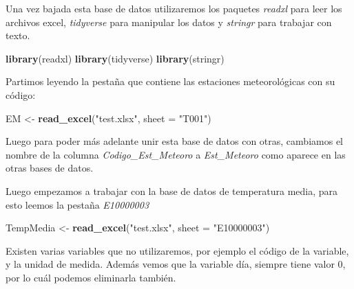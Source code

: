 \documentclass[]{book}
\newenvironment{Shaded}{\begin{snugshade}}{\end{snugshade}}
\newcommand{\DataTypeTok}[1]{\textcolor[rgb]{0.13,0.29,0.53}{#1}}
\newcommand{\KeywordTok}[1]{\textcolor[rgb]{0.13,0.29,0.53}{\textbf{#1}}}
\newcommand{\NormalTok}[1]{#1}
\newcommand{\OperatorTok}[1]{\textcolor[rgb]{0.81,0.36,0.00}{\textbf{#1}}}
\newcommand{\StringTok}[1]{\textcolor[rgb]{0.31,0.60,0.02}{#1}}
\begin{document}
Una vez bajada esta base de datos utilizaremos los paquetes
\emph{readxl} para leer los archivos excel, \emph{tidyverse} para
manipular los datos y \emph{stringr} para trabajar con texto.

\begin{Shaded}
\begin{Highlighting}[]
\KeywordTok{library}\NormalTok{(readxl)}
\KeywordTok{library}\NormalTok{(tidyverse)}
\KeywordTok{library}\NormalTok{(stringr)}
\end{Highlighting}
\end{Shaded}

Partimos leyendo la pestaña que contiene las estaciones meteorológicas
con su código:

\begin{Shaded}
\begin{Highlighting}[]
\NormalTok{EM <-}\StringTok{ }\KeywordTok{read_excel}\NormalTok{(}\StringTok{"test.xlsx"}\NormalTok{, }\DataTypeTok{sheet =} \StringTok{"T001"}\NormalTok{)}
\end{Highlighting}
\end{Shaded}

Luego para poder más adelante unir esta base de datos con otras,
cambiamos el nombre de la columna \emph{Codigo\_Est\_Meteoro} a
\emph{Est\_Meteoro} como aparece en las otras bases de datos.

\begin{Shaded}
\end{Shaded}

Luego empezamos a trabajar con la base de datos de temperatura media,
para esto leemos la pestaña \emph{E10000003}

\begin{Shaded}
\begin{Highlighting}[]
\NormalTok{TempMedia <-}\StringTok{ }\KeywordTok{read_excel}\NormalTok{(}\StringTok{"test.xlsx"}\NormalTok{, }\DataTypeTok{sheet =} \StringTok{"E10000003"}\NormalTok{)}
\end{Highlighting}
\end{Shaded}

Existen varias variables que no utilizaremos, por ejemplo el código de
la variable, y la unidad de medida. Además vemos que la variable día,
siempre tiene valor 0, por lo cuál podemos eliminarla también.
\end{document}
